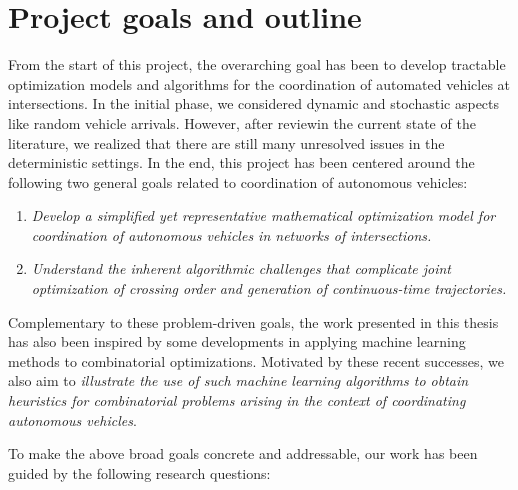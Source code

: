 \documentclass[a4paper]{report}
\theoremstyle{definition}
\theoremstyle{plain}
\begin{document}
\section{Project goals and outline}


From the start of this project, the overarching goal has been to develop
tractable optimization models and algorithms for the coordination of automated
vehicles at intersections.
%
%
In the initial phase, we considered dynamic and stochastic aspects like random
vehicle arrivals. However, after reviewin the current state of the literature,
we realized that there are still many unresolved issues in the deterministic
settings.
%
In the end, this project has been centered around the following two general
goals related to coordination of autonomous vehicles:

\begin{enumerate}[label=\textbullet, leftmargin=3em, rightmargin=4em]
  \item \emph{Develop a simplified yet representative mathematical optimization model
        for coordination of autonomous vehicles in networks of intersections.}

  \item \emph{Understand the inherent algorithmic challenges that complicate joint
        optimization of crossing order and generation of continuous-time
        trajectories.}
\end{enumerate}

Complementary to these problem-driven goals, the work presented in this thesis
has also been inspired by some developments in applying machine learning methods
to combinatorial optimizations.
%
%
Motivated by these recent successes, we also aim to \emph{illustrate the use of
  such machine learning algorithms to obtain heuristics for combinatorial problems arising in the context of coordinating autonomous
  vehicles}.

To make the above broad goals concrete and addressable, our work has been guided
by the following research questions:
\end{document}
